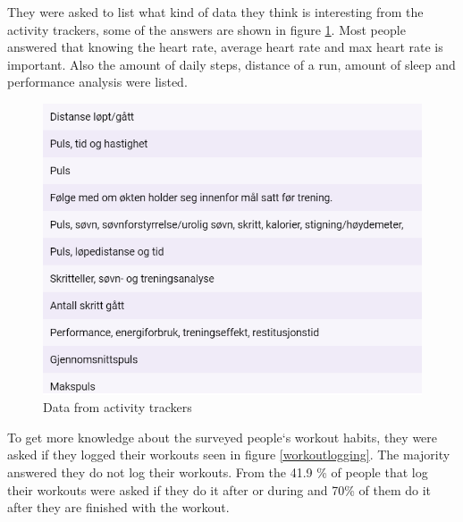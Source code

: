 They were asked to list what kind of data they think is interesting from the activity trackers, some of the answers are shown in figure \ref{data}. Most people answered that knowing the heart rate, average heart rate and max heart rate is important. Also the amount of daily steps, distance of a run, amount of sleep and performance analysis were listed. 
\begin{figure}[H]
    \centering
    \includegraphics[width=120mm]{figures/puls.png}
    \caption{Data from activity trackers}
    \label{data}
\end{figure}
To get more knowledge about the surveyed people`s workout habits, they were asked if they logged their workouts seen in figure \ref{workoutlogging}. The majority answered they do not log their workouts.  From the 41.9 \% of people that log their workouts were asked if they do it after or during and 70\% of them do it after they are finished with the workout.

